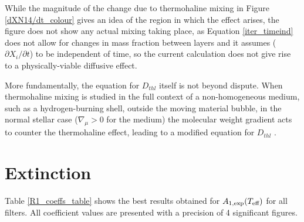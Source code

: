 \documentclass[12pt, a4paper]{report}
\begin{document}
While the magnitude of the change due to thermohaline mixing in Figure \ref{dXN14/dt_colour} gives an idea of the region in which the effect arises, the figure does not show any actual mixing taking place, as Equation \ref{iter_timeind} does not allow for changes in mass fraction between layers and it assumes ($\partial X_{i}/\partial t$) to be independent of time, so the current calculation does not give rise to a physically-viable diffusive effect.
\cite{2010A&A...521A...9C}

More fundamentally, the equation for $D_{thl}$ itself is not beyond dispute. When thermohaline mixing is studied in the full context of a non-homogeneous medium, such as a hydrogen-burning shell, outside the moving material bubble, in the normal stellar case ($\nabla _{\mu} > 0$ for the medium) the molecular weight gradient acts to counter the thermohaline effect, leading to a modified equation for $D_{thl}$ \citep{2010ApJ...723..563D}.

\section{Extinction}
Table \ref{R1_coeffs_table} shows the best results obtained for $A_{1,\textnormal{exp}} (T_{\textnormal{eff}})$ for all filters. All coefficient values are presented with a precision of 4 significant figures. 
\end{document}

